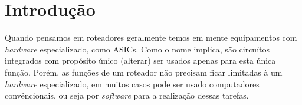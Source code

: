 \section{Introdução}

Quando pensamos em roteadores geralmente temos em mente equipamentos com \textit{hardware} especializado, como \acp{ASIC}. Como o nome implica, são circuítos integrados com propósito único (alterar) ser usados apenas para esta única função. Porém, as funções de um roteador não precisam ficar limitadas à um \textit{hardware} especializado, em muitos casos pode ser usado computadores convêncionais, ou seja por \textit{software} para a realização dessas tarefas. 
